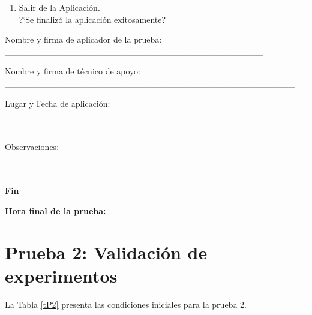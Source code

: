 \begin{enumerate}
{	?`Se cerró la sesión con éxito?
	}
	\item {Salir de la Aplicación.\\	
	?`Se finalizó la aplicación exitosamente?
	}
\end{enumerate}
 
Nombre y firma de aplicador de la prueba:  \_\_\_\_\_\_\_\_\_\_\_\_\_\_\_\_\_\_\_\_\_\_\_\_\_\_\_\_\_\_\_\_\_\_\_\_\_\_\_\_\_

Nombre y firma de técnico de apoyo:
 \_\_\_\_\_\_\_\_\_\_\_\_\_\_\_\_\_\_\_\_\_\_\_\_\_\_\_\_\_\_\_\_\_\_\_\_\_\_\_\_\_\_\_\_\_\_

Lugar y Fecha de aplicación:
 \_\_\_\_\_\_\_\_\_\_\_\_\_\_\_\_\_\_\_\_\_\_\_\_\_\_\_\_\_\_\_\_\_\_\_\_\_\_\_\_\_\_\_\_\_\_\_\_\_\_\_\_\_\_\_

Observaciones:
 \_\_\_\_\_\_\_\_\_\_\_\_\_\_\_\_\_\_\_\_\_\_\_\_\_\_\_\_\_\_\_\_\_\_\_\_\_\_\_\_\_\_\_\_\_\_\_\_\_\_\_\_\_\_\_\_\_\_\_\_\_\_\_\_\_\_\_\_\_\_
  
\textbf{Fin}

\textbf{Hora final de la prueba:\_\_\_\_\_\_\_\_\_\_\_\_}

\section{Prueba 2: Validación de experimentos}

La Tabla \ref{tP2} presenta las condiciones iniciales para la prueba 2.

